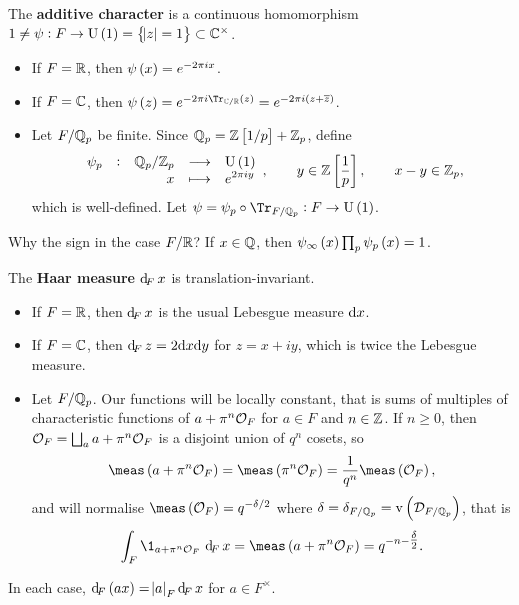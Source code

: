 \begin{definition*}
The \textbf{additive character} is a continuous homomorphism $ 1 \ne \psi : F \to \U\br{1} = \cbr{\abs{z} = 1} \subset \CC^\times $.
\begin{itemize}
\item If $ F = \mathbb{R} $, then $ \psi\br{x} = e^{-2\pi ix} $.
\item If $ F = \mathbb{C} $, then $ \psi\br{z} = e^{-2\pi i\Tr_{\CC / \RR}\br{z}} = e^{-2\pi i\br{z + \overline{z}}} $.
\item Let $ F / \mathbb{Q}_p $ be finite. Since $ \QQ_p = \ZZ\sbr{1 / p} + \ZZ_p $, define
$$ \function[\psi_p]{\QQ_p / \ZZ_p}{\U\br{1}}{x}{e^{2\pi iy}}, \qquad y \in \ZZ\sbr{\dfrac{1}{p}}, \qquad x - y \in \ZZ_p, $$
which is well-defined. Let $ \psi = \psi_p \circ \Tr_{F / \QQ_p} : F \to \U\br{1} $.
\end{itemize}
\end{definition*}

Why the sign in the case $ F / \mathbb{R} $? If $ x \in \mathbb{Q} $, then $ \psi_\infty\br{x}\prod_p \psi_p\br{x} = 1 $.


\begin{definition*}
The \textbf{Haar measure $ \dF x $} is translation-invariant.
\begin{itemize}
\item If $ F = \mathbb{R} $, then $ \dF x $ is the usual Lebesgue measure $ \mathrm{d} x $.
\item If $ F = \mathbb{C} $, then $ \dF z = 2\d x\d y $ for $ z = x + iy $, which is twice the Lebesgue measure.
\item Let $ F / \mathbb{Q}_p $. Our functions will be locally constant, that is sums of multiples of characteristic functions of $ a + \pi^n\mathcal{O}_F $ for $ a \in F $ and $ n \in \mathbb{Z} $. If $ n \ge 0 $, then $ \mathcal{O}_F = \bigsqcup_a a + \pi^n\mathcal{O}_F $ is a disjoint union of $ q^n $ cosets, so
$$ \meas\br{a + \pi^n\OOO_F} = \meas\br{\pi^n\OOO_F} = \dfrac{1}{q^n}\meas\br{\OOO_F}, $$
and will normalise $ \meas\br{\OOO_F} = q^{-\delta / 2} $ where $ \delta = \delta_{F / \QQ_p} = \v\br{\DDD_{F / \QQ_p}} $, that is
$$ \intF{\1_{a + \pi^n\OOO_F}}{x} = \meas\br{a + \pi^n\OOO_F} = q^{-n - \tfrac{\delta}{2}}. $$
\end{itemize}
\end{definition*}

In each case, $ \dF\br{ax} = \abs{a}_F\dF x $ for $ a \in F^\times $.

\pagebreak


